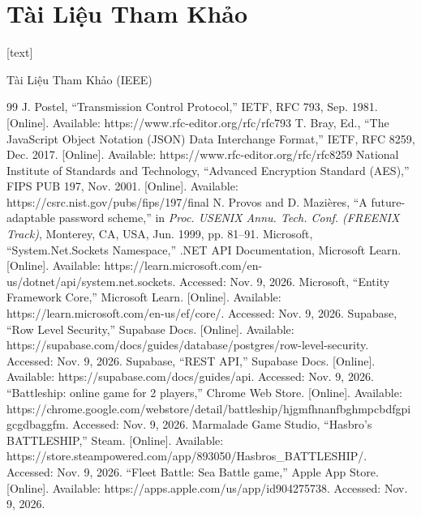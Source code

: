 \section{Tài Liệu Tham Khảo}

[text]

\begin{frame}[allowframebreaks,label=refs]{Tài Liệu Tham Khảo (IEEE)}
  \tiny
  \begin{thebibliography}{99}
     J. Postel, ``Transmission Control Protocol,'' IETF, RFC 793, Sep. 1981. [Online]. Available: https://www.rfc-editor.org/rfc/rfc793
     T. Bray, Ed., ``The JavaScript Object Notation (JSON) Data Interchange Format,'' IETF, RFC 8259, Dec. 2017. [Online]. Available: https://www.rfc-editor.org/rfc/rfc8259
     National Institute of Standards and Technology, ``Advanced Encryption Standard (AES),'' FIPS PUB 197, Nov. 2001. [Online]. Available: https://csrc.nist.gov/pubs/fips/197/final
     N. Provos and D. Mazi\`eres, ``A future-adaptable password scheme,'' in \textit{Proc. USENIX Annu. Tech. Conf. (FREENIX Track)}, Monterey, CA, USA, Jun. 1999, pp. 81--91.
     Microsoft, ``System.Net.Sockets Namespace,'' .NET API Documentation, Microsoft Learn. [Online]. Available: https://learn.microsoft.com/en-us/dotnet/api/system.net.sockets. Accessed: Nov. 9, 2026.
     Microsoft, ``Entity Framework Core,'' Microsoft Learn. [Online]. Available: https://learn.microsoft.com/en-us/ef/core/. Accessed: Nov. 9, 2026.
     Supabase, ``Row Level Security,'' Supabase Docs. [Online]. Available: https://supabase.com/docs/guides/database/postgres/row-level-security. Accessed: Nov. 9, 2026.
     Supabase, ``REST API,'' Supabase Docs. [Online]. Available: https://supabase.com/docs/guides/api. Accessed: Nov. 9, 2026.
     ``Battleship: online game for 2 players,'' Chrome Web Store. [Online]. Available: https://chrome.google.com/webstore/detail/battleship/hjgmfhnanfbghmpcbdfgpigcgdbaggfm. Accessed: Nov. 9, 2026.
     Marmalade Game Studio, ``Hasbro's BATTLESHIP,'' Steam. [Online]. Available: https://store.steampowered.com/app/893050/Hasbros\_BATTLESHIP/. Accessed: Nov. 9, 2026.
     ``Fleet Battle: Sea Battle game,'' Apple App Store. [Online]. Available: https://apps.apple.com/us/app/id904275738. Accessed: Nov. 9, 2026.
  \end{thebibliography}
\end{frame}

